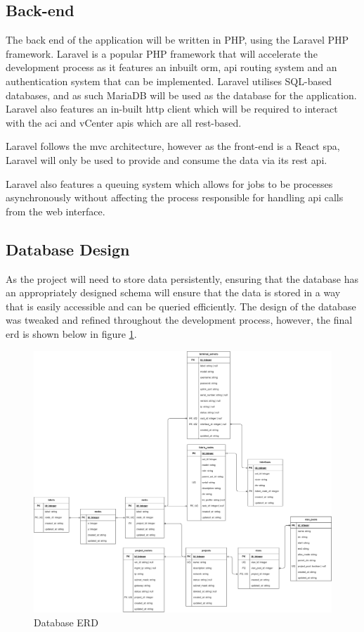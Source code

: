 \subsection{Back-end}
\label{design:web-application:back-end}
The back end of the application will be
written in PHP, using the Laravel PHP framework. Laravel is a popular PHP
framework that will accelerate the development process as it features an
inbuilt \gls{orm}, \gls{api} routing system and an authentication system that
can be implemented. Laravel utilises SQL-based databases, and as such MariaDB
will be used as the database for the application. Laravel also features an
in-built \gls{http} client which will be required to interact with the
\gls{aci} and vCenter \gls{api}s which are all \gls{rest}-based.

Laravel
follows the \gls{mvc} architecture, however as the front-end is a React
\gls{spa}, Laravel will only be used to provide and consume the data via its
\gls{rest} \gls{api}.

Laravel also features a queuing system which allows for jobs to be processes asynchronously without affecting the process responsible for handling \gls{api} calls from the web interface.

\subsection{Database Design}
\label{design:web-application:database}
As the project will need to store data
persistently, ensuring that the database has an appropriately designed schema
will ensure that the data is stored in a way that is easily accessible and can
be queried efficiently. The design of the database was tweaked and refined
throughout the development process, however, the final \gls{erd} is shown below
in figure \ref{fig:database-erd}.

\begin{figure}[H]
    \centering

    \includegraphics[scale=0.1]{images/erd.png}
    \caption{Database ERD}

    \label{fig:database-erd}
\end{figure}

